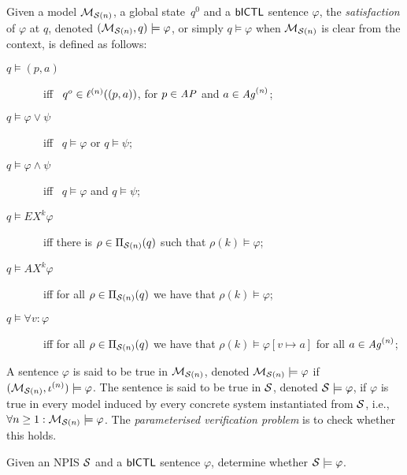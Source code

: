 \begin{definition}[Satisfaction]
  \label{def:sat} 
  Given a model $\mathcal{M}_{\mathcal{S}(n)}$, a global state~$q^0$ and a $\sf{bICTL}$ sentence
  $\varphi$, the \emph{satisfaction} of $\varphi$ at $q$, denoted $(\mathcal{M}_{\mathcal{S}(n)}, q)
  \models\varphi$, or simply $q \models \varphi$ when $\mathcal{M}_{\mathcal{S}(n)}$ is clear from
  the context, is defined as follows:
  \begin{description}
  \item[$q \models (p, a)$] \ iff \ $q^o \in \ell^{(n)}((p, a))$, for $p \in
  \it{AP}$ and $a \in \it{Ag}^{(n)}$; 
  \item[$q \models \varphi \lor \psi$] \ iff \ $q \models \varphi$ or $q \models
  \psi$;
  \item[$q \models \varphi \land \psi$] \ iff \ $q \models \varphi$ and $q
  \models \psi$;
  \item[$q \models EX^k  \varphi$] \ iff  there is $\rho \in \Pi_{\mathcal{S}(n)}(q)$ such
  that $\rho(k) \models \varphi$;
  \item[$q \models AX^k  \varphi$] \ iff for all $\rho \in \Pi_{\mathcal{S}(n)}(q)$ we
  have that $\rho(k) \models \varphi$;
  \item[$q \models \forall v : \varphi$] \ iff for all $\rho \in \Pi_{\mathcal{S}(n)}(q)$ we
  have that $\rho(k) \models \varphi[v \mapsto a]$ for all $a \in \it{Ag}^{(n)}$;
    \end{description}
\end{definition}

A sentence $\varphi$ is said to be true in $\mathcal{M}_{\mathcal{S}(n)}$, denoted $\mathcal{M}_{\mathcal{S}(n)} \models
\varphi$ if $(\mathcal{M}_{\mathcal{S}(n)}, \iota^{({n})}) \models \varphi$. The sentence is said to
be true in $\mathcal{S}$, denoted $\mathcal{S} \models \varphi$, if $\varphi$ is true in
every model induced by every concrete system instantiated from $\mathcal{S}$, i.e.,
$\forall n \geq 1 : \mathcal{M}_{\mathcal{S}(n)} \models \varphi$. The {\em parameterised
verification problem} is to check whether this holds.


\begin{definition}
  Given an NPIS $\mathcal{S}$ and a $\sf{bICTL}$ sentence $\varphi$, determine whether
  $\mathcal{S} \models \varphi$.
\end{definition}

  

